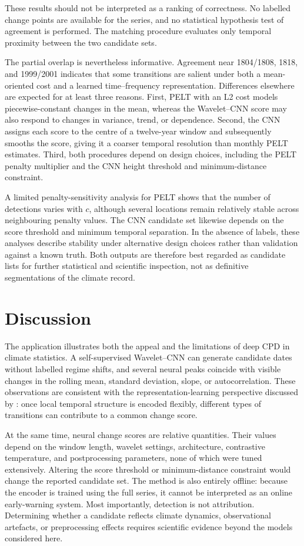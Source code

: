 \documentclass[
]{krantz}
\newcounter{none} %
\begin{document}
These results should not be interpreted as a ranking of correctness. No labelled change points are available for the series, and no statistical hypothesis test of agreement is performed. The matching procedure evaluates only temporal proximity between the two candidate sets.

The partial overlap is nevertheless informative. Agreement near 1804/1808, 1818, and 1999/2001 indicates that some transitions are salient under both a mean-oriented cost and a learned time--frequency representation. Differences elsewhere are expected for at least three reasons. First, PELT with an L2 cost models piecewise-constant changes in the mean, whereas the Wavelet--CNN score may also respond to changes in variance, trend, or dependence. Second, the CNN assigns each score to the centre of a twelve-year window and subsequently smooths the score, giving it a coarser temporal resolution than monthly PELT estimates. Third, both procedures depend on design choices, including the PELT penalty multiplier and the CNN height threshold and minimum-distance constraint.

A limited penalty-sensitivity analysis for PELT shows that the number of detections varies with \(c\), although several locations remain relatively stable across neighbouring penalty values. The CNN candidate set likewise depends on the score threshold and minimum temporal separation. In the absence of labels, these analyses describe stability under alternative design choices rather than validation against a known truth. Both outputs are therefore best regarded as candidate lists for further statistical and scientific inspection, not as definitive segmentations of the climate record.

\section{Discussion}\label{discussion-3}

The application illustrates both the appeal and the limitations of deep CPD in climate statistics. A self-supervised Wavelet--CNN can generate candidate dates without labelled regime shifts, and several neural peaks coincide with visible changes in the rolling mean, standard deviation, slope, or autocorrelation. These observations are consistent with the representation-learning perspective discussed by \citep{xu2025}: once local temporal structure is encoded flexibly, different types of transitions can contribute to a common change score.

At the same time, neural change scores are relative quantities. Their values depend on the window length, wavelet settings, architecture, contrastive temperature, and postprocessing parameters, none of which were tuned extensively. Altering the score threshold or minimum-distance constraint would change the reported candidate set. The method is also entirely offline: because the encoder is trained using the full series, it cannot be interpreted as an online early-warning system. Most importantly, detection is not attribution. Determining whether a candidate reflects climate dynamics, observational artefacts, or preprocessing effects requires scientific evidence beyond the models considered here.
\end{document}
